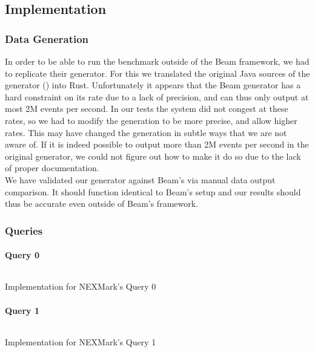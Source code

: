 \subsection{Implementation}
\subsubsection{Data Generation}
In order to be able to run the benchmark outside of the Beam framework, we had to replicate their generator. For this we translated the original Java sources of the generator () into Rust. Unfortunately it appears that the Beam generator has a hard constraint on its rate due to a lack of precision, and can thus only output at most 2M events per second. In our tests the system did not congest at these rates, so we had to modify the generation to be more precise, and allow higher rates. This may have changed the generation in subtle ways that we are not aware of. If it is indeed possible to output more than 2M events per second in the original generator, we could not figure out how to make it do so due to the lack of proper documentation. \\

We have validated our generator against Beam's via manual data output comparison. It should function identical to Beam's setup and our results should thus be accurate even outside of Beam's framework.

\subsubsection{Queries}
\paragraph{Query 0}
\begin{listing}[H]
  \inputminted[firstline=449,lastline=449]{rust}{benchmarks/src/nexmark.rs}
  \caption{Implementation for NEXMark's Query 0}
  \label{lst:nexmark-query0}
\end{listing}

\paragraph{Query 1}\label{sec:query1}
\begin{listing}[H]
  \inputminted[firstline=474,lastline=476]{rust}{benchmarks/src/nexmark.rs}
  \caption{Implementation for NEXMark's Query 1}
  \label{lst:nexmark-query1}
\end{listing}

